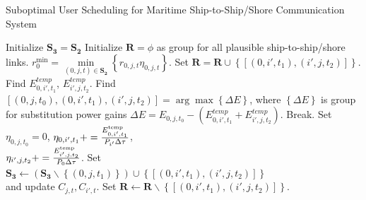 \documentclass[conference]{IEEEtran}
\begin{document}
\begin{algorithm}[!h]
\caption{Suboptimal User Scheduling for Maritime Ship-to-Ship/Shore Communication System}
\label{alg:1}
\begin{algorithmic}[1]
\STATE Initialize ${{\mathbf{S}}_{\mathbf{3}}}={{\mathbf{S}}_{\mathbf{2}}}$
  \STATE Initialize ${\mathbf{R}} = \phi $ as group for all plausible ship-to-ship/shore links.
  \STATE $r_0^{\min } = \mathop {\min }\limits_{\left( {0,j,t} \right) \in {{\mathbf{S}}_{\mathbf{2}}}} \left\{ {r_{0,j,t}{\eta _{0,j,t}}} \right\}$.
            \STATE Set ${\mathbf{R = R}} \cup \left\{ {\left[ {\left( {0,i',{t_1}} \right),\left( {i',j,{t_2}} \right)} \right]} \right\}$.
          \ENDIF
        \ENDFOR
      \ENDIF
    \ENDFOR
  \ENDFOR
    \STATE Find ${E_{0,i',{t_1}}^{temp}}$, ${E_{i',j,{t_2}}^{temp}}$. 
    \STATE Find \\ $\left[ {\left( {0,j,{t_0}} \right),\left( {0,i',{t_1}} \right),\left( {i',j,{t_2}} \right)} \right] = \arg \max \left\{ {\Delta E} \right\}$, where ${\left\{ {\Delta E} \right\}}$ is group for substitution power gains $\Delta E = {E_{0,j,{t_0}}} - \left( {{E_{0,i',{t_1}}^{temp}} + {E_{i',j,{t_2}}^{temp}}} \right)$. 
      \STATE Break.
    \ENDIF
    \STATE Set ${\eta _{0,j,{t_0}} = 0}$, ${\eta _{0,i',{t_1}}} += \frac{{{E_{0,i',{t_1}}^{{\rm{temp}}}}}}{{P_{i'}}\Delta \tau}$,\\ ${\eta _{i',j,{t_2}}} += \frac{{{E_{i',j,{t_2}}^{{\rm{temp}}}}}}{P_{0}\Delta \tau}$.
    \STATE Set ${{\mathbf{S}}_{\mathbf{3}}} \leftarrow \left( {{{\mathbf{S}}_{\mathbf{3}}}\backslash \left\{ {\left( {0,j,{t_1}} \right)} \right\}} \right) \cup \left\{ {\left[ {\left( {0,i',{t_1}} \right),\left( {i',j,{t_2}} \right)} \right]} \right\}$ \\ and update ${C_{j,t}},{C_{i',t}}$.
    \STATE Set $\mathbf{R} \leftarrow \mathbf{R}\backslash \left\{ {\left[ {\left( {0,i',{t_1}} \right),\left( {i',j,{t_2}} \right)} \right]} \right\}$.
  \ENDWHILE
\ENDFOR
\end{algorithmic}
\end{algorithm}
\end{document}
